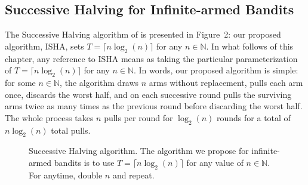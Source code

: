 




\subsection{Successive Halving for Infinite-armed Bandits}\label{theory}
The Successive Halving algorithm of \cite{icml2013_karnin13} is presented in Figure~2: our proposed algorithm, ISHA, sets $T=\lceil n\log_2(n)\rceil$ for any $n \in \mathbb{N}$.
In what follows of this chapter, any reference to ISHA means as taking the particular parameterization of $T=\lceil n \log_2(n) \rceil$ for any $n \in \mathbb{N}$.
In words, our proposed algorithm is simple: for some $n \in \mathbb{N}$, the algorithm draws $n$ arms without replacement, pulls each arm once, discards the worst half, and on each successive round pulls the surviving arms twice as many times as the previous round before discarding the worst half. The whole process takes $n$ pulls per round for $\log_2(n)$ rounds for a total of $n \log_2(n)$ total pulls.

\begin{figure}[h]
\centering
{}
\caption{Successive Halving algorithm. The algorithm we propose for infinite-armed bandits is to use $T = \lceil n \log_2(n) \rceil$ for any value of $n \in \mathbb{N}$. For anytime, double $n$ and repeat.}\label{alg-SH}
\end{figure}

